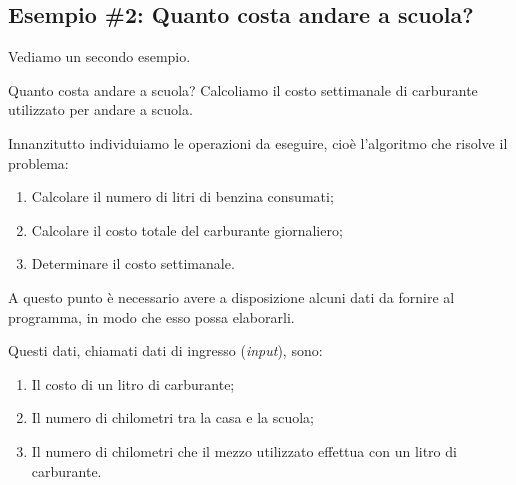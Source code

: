 \documentclass[
    notheorems,
    11pt,
    compress,
    aspectratio=169
]{beamer}
\begin{document}

\subsection{Esempio \#2: Quanto costa andare a scuola?}

\begin{frame}

    Vediamo un secondo esempio.

    \begin{block}{Quanto costa andare a scuola?}
        Calcoliamo il costo settimanale di carburante utilizzato per andare a scuola.

        \vspace{\baselineskip}
        \pause
        
        Innanzitutto individuiamo le operazioni da eseguire, cioè l’algoritmo che risolve il problema:

        \pause
        
        \begin{enumerate}
            \item Calcolare il numero di litri di benzina consumati;
            \pause
            \item Calcolare il costo totale del carburante giornaliero;
            \pause
            \item Determinare il costo settimanale.
        \end{enumerate}
    \end{block}
\end{frame}

\begin{frame}

    A questo punto è necessario avere a disposizione alcuni dati da fornire al programma, in modo che esso possa elaborarli.

    \vspace{\baselineskip}
    
    Questi dati, chiamati dati di ingresso (\textit{input}), sono:

    \pause
        
    \begin{enumerate}
        \item Il costo di un litro di carburante;
        \pause
        \item Il numero di chilometri tra la casa e la scuola;
        \pause
        \item Il numero di chilometri che il mezzo utilizzato effettua con un litro di carburante.
    \end{enumerate}
\end{frame}
\end{document}
